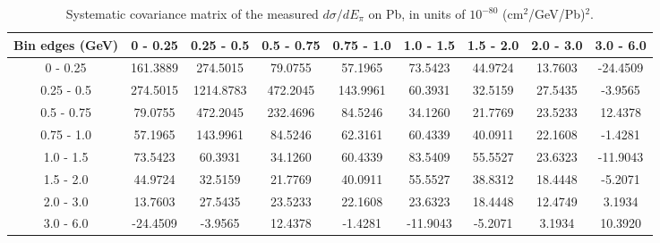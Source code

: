\documentclass[aps,prl,twocolumn,superscriptaddress,nofootinbib]{revtex4-1}
\begin{document}
\begin{table}[h!]
  \centering
  \caption{Systematic covariance matrix of the measured $d\sigma/dE_{\pi}$ on Pb, in units of $10^{-80}$ (cm$^{2}$/GeV/Pb)$^{2}$.}
    \begin{tabular}{c||cccccccc}
      Bin edges (GeV) & 0 - 0.25 & 0.25 - 0.5 & 0.5 - 0.75 & 0.75 - 1.0 & 1.0 - 1.5 & 1.5 - 2.0 & 2.0 - 3.0 & 3.0 - 6.0 \\
\hline \hline
        0 - 0.25 & 161.3889 & 274.5015 & 79.0755 & 57.1965 & 73.5423 & 44.9724 & 13.7603 & -24.4509 \\
      0.25 - 0.5 & 274.5015 & 1214.8783 & 472.2045 & 143.9961 & 60.3931 & 32.5159 & 27.5435 & -3.9565 \\
      0.5 - 0.75 & 79.0755 & 472.2045 & 232.4696 & 84.5246 & 34.1260 & 21.7769 & 23.5233 & 12.4378 \\
      0.75 - 1.0 & 57.1965 & 143.9961 & 84.5246 & 62.3161 & 60.4339 & 40.0911 & 22.1608 & -1.4281 \\
       1.0 - 1.5 & 73.5423 & 60.3931 & 34.1260 & 60.4339 & 83.5409 & 55.5527 & 23.6323 & -11.9043 \\
       1.5 - 2.0 & 44.9724 & 32.5159 & 21.7769 & 40.0911 & 55.5527 & 38.8312 & 18.4448 & -5.2071 \\
       2.0 - 3.0 & 13.7603 & 27.5435 & 23.5233 & 22.1608 & 23.6323 & 18.4448 & 12.4749 &  3.1934 \\
       3.0 - 6.0 & -24.4509 & -3.9565 & 12.4378 & -1.4281 & -11.9043 & -5.2071 &  3.1934 & 10.3920 \\
    \end{tabular}
  \label{tablecov:Pb_Systematic_Epi}
\end{table}
\end{document}
